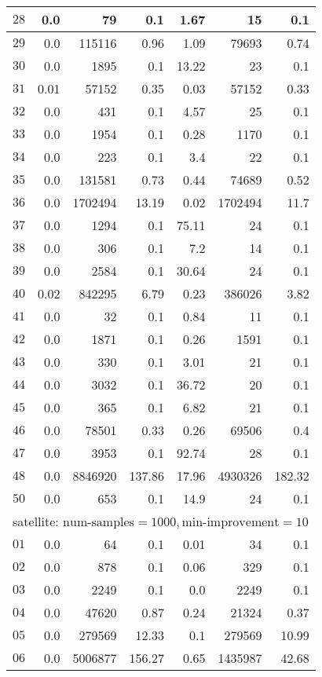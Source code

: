 \begin{longtable}{|c||r|r|r||r|r|r|}
$28$ & 0.0 & 79 & 0.1 &1.67 & 15 & 0.1 \\\hline
$29$ & 0.0 & 115116 & 0.96 &1.09 & 79693 & 0.74 \\\hline
$30$ & 0.0 & 1895 & 0.1 &13.22 & 23 & 0.1 \\\hline
$31$ & 0.01 & 57152 & 0.35 &0.03 & 57152 & 0.33 \\\hline
$32$ & 0.0 & 431 & 0.1 &4.57 & 25 & 0.1 \\\hline
$33$ & 0.0 & 1954 & 0.1 &0.28 & 1170 & 0.1 \\\hline
$34$ & 0.0 & 223 & 0.1 &3.4 & 22 & 0.1 \\\hline
$35$ & 0.0 & 131581 & 0.73 &0.44 & 74689 & 0.52 \\\hline
$36$ & 0.0 & 1702494 & 13.19 &0.02 & 1702494 & 11.7 \\\hline
$37$ & 0.0 & 1294 & 0.1 &75.11 & 24 & 0.1 \\\hline
$38$ & 0.0 & 306 & 0.1 &7.2 & 14 & 0.1 \\\hline
$39$ & 0.0 & 2584 & 0.1 &30.64 & 24 & 0.1 \\\hline
$40$ & 0.02 & 842295 & 6.79 &0.23 & 386026 & 3.82 \\\hline
$41$ & 0.0 & 32 & 0.1 &0.84 & 11 & 0.1 \\\hline
$42$ & 0.0 & 1871 & 0.1 &0.26 & 1591 & 0.1 \\\hline
$43$ & 0.0 & 330 & 0.1 &3.01 & 21 & 0.1 \\\hline
$44$ & 0.0 & 3032 & 0.1 &36.72 & 20 & 0.1 \\\hline
$45$ & 0.0 & 365 & 0.1 &6.82 & 21 & 0.1 \\\hline
$46$ & 0.0 & 78501 & 0.33 &0.26 & 69506 & 0.4 \\\hline
$47$ & 0.0 & 3953 & 0.1 &92.74 & 28 & 0.1 \\\hline
$48$ & 0.0 & 8846920 & 137.86 &17.96 & 4930326 & 182.32 \\\hline
$50$ & 0.0 & 653 & 0.1 &14.9 & 24 & 0.1 \\\hline

\multicolumn{7}{|l|}{satellite: $\text{num-samples}=1000,\text{min-improvement}=10$}\\\hline
$01$ & 0.0 & 64 & 0.1 &0.01 & 34 & 0.1 \\\hline
$02$ & 0.0 & 878 & 0.1 &0.06 & 329 & 0.1 \\\hline
$03$ & 0.0 & 2249 & 0.1 &0.0 & 2249 & 0.1 \\\hline
$04$ & 0.0 & 47620 & 0.87 &0.24 & 21324 & 0.37 \\\hline
$05$ & 0.0 & 279569 & 12.33 &0.1 & 279569 & 10.99 \\\hline
$06$ & 0.0 & 5006877 & 156.27 &0.65 & 1435987 & 42.68 \\\hline


\end{longtable}
